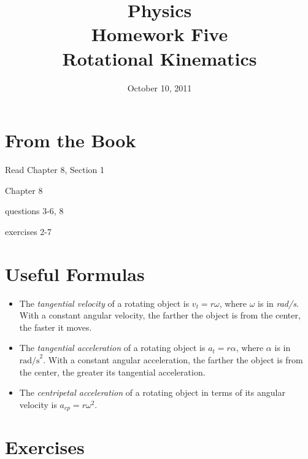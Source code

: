 \documentclass{exam}
\title{Physics \\ Homework Five \\Rotational Kinematics}
\date{October 10, 2011}
\begin{document}
\maketitle

\section{From the Book}

\begin{itemize*}
  \item Read Chapter 8, Section 1
  \item Chapter 8
    \begin{itemize*}
      \item questions 3-6, 8
      \item exercises 2-7
    \end{itemize*}
\end{itemize*}

\section{Useful Formulas}

\begin{itemize}
\item The {\em tangential velocity} of a rotating object is $v_t = r \omega$, where $\omega$ is in {\em rad/s}.  With a
  constant angular velocity, the farther the object is from the center, the faster it moves.

\item The {\em tangential acceleration} of a rotating object is $a_t = r \alpha$, where $\alpha$ is in $\text{
  rad/s}^2$.  With a constant angular acceleration, the farther the object is from the center, the greater its
  tangential acceleration.

\item The {\em centripetal acceleration} of a rotating object in terms of its angular velocity is $a_{cp} = r \omega^2$.

\end{itemize}

\section{Exercises}
\end{document}
